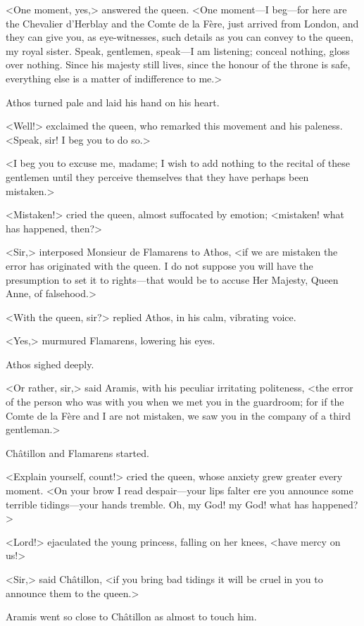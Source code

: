<One moment, yes,> answered the queen. <One moment—I beg—for here are the Chevalier d'Herblay and the Comte de la Fère, just arrived from London, and they can give you, as eye-witnesses, such details as you can convey to the queen, my royal sister. Speak, gentlemen, speak—I am listening; conceal nothing, gloss over nothing. Since his majesty still lives, since the honour of the throne is safe, everything else is a matter of indifference to me.>

Athos turned pale and laid his hand on his heart.

<Well!> exclaimed the queen, who remarked this movement and his paleness. <Speak, sir! I beg you to do so.>

<I beg you to excuse me, madame; I wish to add nothing to the recital of these gentlemen until they perceive themselves that they have perhaps been mistaken.>

<Mistaken!> cried the queen, almost suffocated by emotion; <mistaken! what has happened, then?>

<Sir,> interposed Monsieur de Flamarens to Athos, <if we are mistaken the error has originated with the queen. I do not suppose you will have the presumption to set it to rights—that would be to accuse Her Majesty, Queen Anne, of falsehood.>

<With the queen, sir?> replied Athos, in his calm, vibrating voice.

<Yes,> murmured Flamarens, lowering his eyes.

Athos sighed deeply.

<Or rather, sir,> said Aramis, with his peculiar irritating politeness, <the error of the person who was with you when we met you in the guardroom; for if the Comte de la Fère and I are not mistaken, we saw you in the company of a third gentleman.>

Châtillon and Flamarens started.

<Explain yourself, count!> cried the queen, whose anxiety grew greater every moment. <On your brow I read despair—your lips falter ere you announce some terrible tidings—your hands tremble. Oh, my God! my God! what has happened?>

<Lord!> ejaculated the young princess, falling on her knees, <have mercy on us!>

<Sir,> said Châtillon, <if you bring bad tidings it will be cruel in you to announce them to the queen.>

Aramis went so close to Châtillon as almost to touch him.

